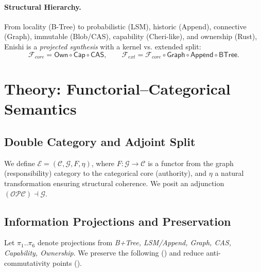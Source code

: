 \documentclass[10pt]{article}
\begin{document}
\paragraph{Structural Hierarchy.}
From locality (B-Tree) to probabilistic (LSM), historic (Append), connective (Graph),
immutable (Blob/CAS), capability (Cheri-like), and ownership (Rust), Enishi is a \emph{projected synthesis} with a kernel vs. extended split:
\[
\mathcal{F}_{core} = \mathsf{Own} \circ \mathsf{Cap} \circ \mathsf{CAS}, \qquad
\mathcal{F}_{ext} = \mathcal{F}_{core} \circ \mathsf{Graph} \circ \mathsf{Append} \circ \mathsf{BTree}.
\]

\section{Theory: Functorial--Categorical Semantics}
\subsection{Double Category and Adjoint Split}
We define $\mathcal{E} = (\mathcal{C},\mathcal{G},F,\eta)$, where
$F:\mathcal{G}\to\mathcal{C}$ is a functor from the graph (responsibility) category to the categorical core (authority),
and $\eta$ a natural transformation ensuring structural coherence. We posit an adjunction
$(\mathcal{O}\mathcal{P}\mathcal{C}) \dashv \mathcal{G}$.

\subsection{Information Projections and Preservation}
Let $\pi_1.. \pi_6$ denote projections from \emph{B+Tree, LSM/Append, Graph, CAS, Capability, Ownership}.
We preserve the following () and reduce anti-commutativity points ().
\end{document}
